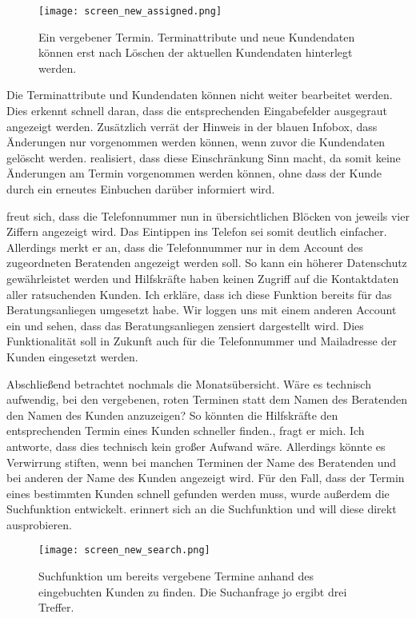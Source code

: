 \begin{figure}[H]
    \caption{Ein vergebener Termin. Terminattribute und neue Kundendaten können erst nach Löschen der aktuellen Kundendaten hinterlegt werden.}
    \centering
    \texttt{[image: screen\_new\_assigned.png]}
\end{figure}

Die Terminattribute und Kundendaten können nicht weiter bearbeitet werden. Dies
erkennt \ipName schnell daran, dass die entsprechenden Eingabefelder ausgegraut
angezeigt werden. Zusätzlich verrät der Hinweis in der blauen Infobox, dass
Änderungen nur vorgenommen werden können, wenn zuvor die Kundendaten gelöscht
werden. \ipName realisiert, dass diese Einschränkung Sinn macht, da somit keine
Änderungen am Termin vorgenommen werden können, ohne dass der Kunde durch ein
erneutes Einbuchen darüber informiert wird.

\ipName freut sich, dass die Telefonnummer nun in übersichtlichen Blöcken von jeweils vier Ziffern angezeigt wird. Das Eintippen ins Telefon sei somit deutlich einfacher. Allerdings merkt er an, dass die Telefonnummer nur in dem Account des zugeordneten Beratenden angezeigt werden soll. So kann ein höherer Datenschutz gewährleistet werden und Hilfskräfte haben keinen Zugriff auf die Kontaktdaten aller ratsuchenden Kunden. Ich erkläre, dass ich diese Funktion bereits für das Beratungsanliegen umgesetzt habe. Wir loggen uns mit einem anderen Account ein und sehen, dass das Beratungsanliegen zensiert dargestellt wird. Dies Funktionalität soll in Zukunft auch für die Telefonnummer und Mailadresse der Kunden eingesetzt werden.

Abschließend betrachtet \ipName nochmals die Monatsübersicht. \glqq{}Wäre es
technisch aufwendig, bei den vergebenen, roten Terminen statt dem Namen des
Beratenden den Namen des Kunden anzuzeigen? So könnten die Hilfskräfte den
entsprechenden Termin eines Kunden schneller finden.\grqq{}, fragt er
mich\cite{clavesUsertest}. Ich antworte, dass dies technisch kein großer
Aufwand wäre. Allerdings könnte es Verwirrung stiften, wenn bei manchen
Terminen der Name des Beratenden und bei anderen der Name des Kunden angezeigt
wird. Für den Fall, dass der Termin eines bestimmten Kunden schnell gefunden
werden muss, wurde außerdem die Suchfunktion entwickelt. \ipName erinnert sich
an die Suchfunktion und will diese direkt ausprobieren.

\begin{figure}[H]
    \caption{Suchfunktion um bereits vergebene Termine anhand des eingebuchten Kunden zu finden. Die Suchanfrage \glqq{}jo\grqq{} ergibt drei Treffer.}
    \centering
    \texttt{[image: screen\_new\_search.png]}
\end{figure}

